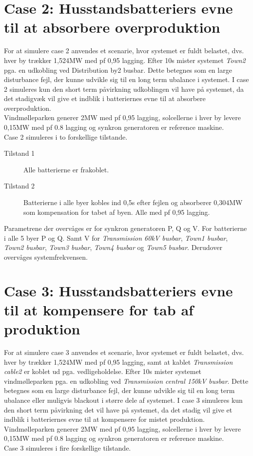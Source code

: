 \section{Case 2: Husstandsbatteriers evne til at absorbere overproduktion}
\label{SimCase2}
For at simulere case 2 anvendes et scenarie, hvor systemet er fuldt belastet, dvs. hver by trækker 1,524MW med pf 0,95 lagging. Efter 10s mister systemet \textit{Town2} pga. en udkobling ved Distribution by2 busbar. Dette betegnes som en large disturbance fejl, der kunne udvikle sig til en long term ubalance i systemet. I case 2 simuleres kun den short term påvirkning udkoblingen vil have på systemet, da det stadigvæk vil give et indblik i batteriernes evne til at absorbere overproduktion.\\
Vindmølleparken generer 2MW med pf 0,95 lagging, solcellerne i hver by levere 0,15MW med pf 0.8 lagging og synkron generatoren er reference maskine.\\
Case 2 simuleres i to forskellige tilstande.

\begin{description}
	\item[Tilstand 1] Alle batterierne er frakoblet.
	\item[Tilstand 2] Batterierne i alle byer kobles ind 0,5s efter fejlen og absorberer 0,304MW som kompensation for tabet af byen. Alle med pf 0,95 lagging.
\end{description}

Parametrene der overvåges er for synkron generatoren P, Q og V.
For batterierne i alle 5 byer P og Q. Samt V for \textit{Transmission 60kV busbar}, \textit{Town1 busbar}, \textit{Town2 busbar}, \textit{Town3 busbar}, \textit{Town4 busbar} og \textit{Town5 busbar}.
Derudover overvåges systemfrekvensen.

\section{Case 3: Husstandsbatteriers evne til at kompensere for tab af produktion}
\label{SimCase3}
For at simulere case 3 anvendes et scenarie, hvor systemet er fuldt belastet, dvs. hver by trækker 1,524MW med pf 0,95 lagging, samt at kablet \textit{Transmission cable2} er koblet ud pga. vedligeholdelse. Efter 10s mister systemet vindmølleparken pga. en udkobling ved \textit{Transmission central 150kV busbar}. Dette betegnes som en large disturbance fejl, der kunne udvikle sig til en long term ubalance eller muligvis blackout i større dele af systemet. I case 3 simuleres kun den short term påvirkning det vil have på systemet, da det stadig vil give et indblik i batteriernes evne til at kompensere for mistet produktion.\\
Vindmølleparken generer 2MW med pf 0,95 lagging, solcellerne i hver by levere 0,15MW med pf 0.8 lagging og synkron generatoren er reference maskine.\\
Case 3 simuleres i fire forskellige tilstande.

